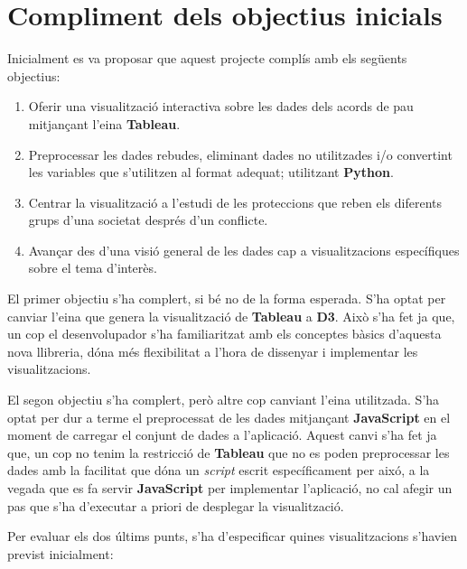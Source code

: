 \documentclass{article}
\begin{document}
\section{Compliment dels objectius inicials}
Inicialment es va proposar que aquest projecte complís amb els següents
objectius:
\begin{enumerate}
    \item Oferir una visualització interactiva sobre les dades dels acords de
        pau mitjançant l'eina \textbf{Tableau}.
    \item Preprocessar les dades rebudes, eliminant dades no utilitzades i/o
        convertint les variables que s'utilitzen al format adequat; utilitzant
        \textbf{Python}.
    \item Centrar la visualització a l'estudi de les proteccions que reben els
        diferents grups d'una societat després d'un conflicte.
    \item Avançar des d'una visió general de les dades cap a visualitzacions
        específiques sobre el tema d'interès.
\end{enumerate}

El primer objectiu s'ha complert, si bé no de la forma esperada. S'ha optat per
canviar l'eina que genera la visualització de \textbf{Tableau} a \textbf{D3}.
Això s'ha fet ja que, un cop el desenvolupador s'ha familiaritzat amb els
conceptes bàsics d'aquesta nova llibreria, dóna més flexibilitat a l'hora de
dissenyar i implementar les visualitzacions.

El segon objectiu s'ha complert, però altre cop canviant l'eina utilitzada. S'ha
optat per dur a terme el preprocessat de les dades mitjançant \textbf{JavaScript}
en el moment de carregar el conjunt de dades a l'aplicació. Aquest canvi s'ha
fet ja que, un cop no tenim la restricció de \textbf{Tableau} que no es poden
preprocessar les dades amb la facilitat que dóna un \textit{script} escrit
específicament per aixó, a la vegada que es fa servir \textbf{JavaScript} per
implementar l'aplicació, no cal afegir un pas que s'ha d'executar a priori de
desplegar la visualització.

Per evaluar els dos últims punts, s'ha d'especificar quines visualitzacions
s'havien previst inicialment:
\end{document}

